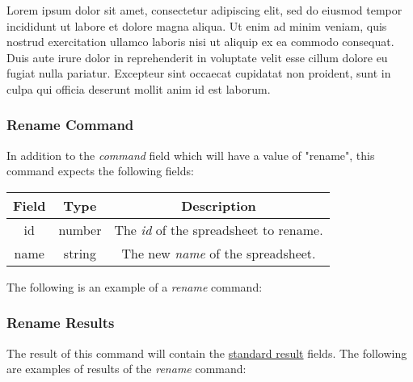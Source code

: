 Lorem ipsum dolor sit amet, consectetur adipiscing elit, sed do eiusmod tempor incididunt ut labore et dolore magna aliqua. Ut enim ad minim veniam, quis nostrud exercitation ullamco laboris nisi ut aliquip ex ea commodo consequat. Duis aute irure dolor in reprehenderit in voluptate velit esse cillum dolore eu fugiat nulla pariatur. Excepteur sint occaecat cupidatat non proident, sunt in culpa qui officia deserunt mollit anim id est laborum.

\subsubsection{Rename Command}
In addition to the \emph{command} field which will have a value of "rename", this command expects the following fields:

\begin{table}[H]
    \begin{center}
        \begin{tabular}{|c|c|c|}\hline
            Field & Type & Description \\\hline
            id & number & The \emph{id} of the spreadsheet to rename. \\\hline
            name & string & The new \emph{name} of the spreadsheet. \\\hline
        \end{tabular}
    \end{center}
\end{table}

The following is an example of a \emph{rename} command:


\subsubsection{Rename Results}
The result of this command will contain the \hyperref[sec:message:result]{standard result} fields.
The following are examples of results of the \emph{rename} command:





